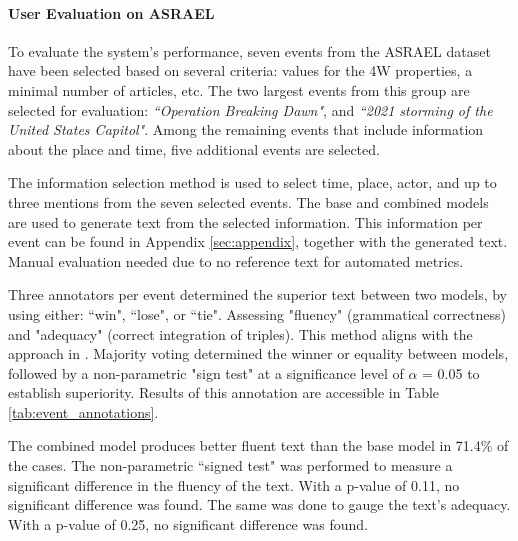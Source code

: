 \documentclass[
hf, %
]{ceurart}
\begin{document}
\paragraph*{User Evaluation on ASRAEL}
\label{sec:result_gen_text_nodes}
To evaluate the system's performance, seven events from the ASRAEL dataset have been selected based on several criteria: values for the 4W properties, a minimal number of articles, etc. The two largest events from this group are selected for evaluation: \textit{``Operation Breaking Dawn"}, and \textit{``2021 storming of the United States Capitol"}. Among the remaining events that include information about the place and time, five additional events are selected.

The information selection method is used to select time, place, actor, and up to three mentions from the seven selected events. The base and combined models are used to generate text from the selected information. This information per event can be found in Appendix \ref{sec:appendix}, together with the generated text. Manual evaluation needed due to no reference text for automated metrics.

Three annotators per event determined the superior text between two models, by using either: ``win", ``lose", or ``tie". Assessing "fluency" (grammatical correctness) and "adequacy" (correct integration of triples). This method aligns with the approach in \cite{JointGT}. Majority voting determined the winner or equality between models, followed by a non-parametric "sign test" at a significance level of $\alpha$ = 0.05 to establish superiority. Results of this annotation are accessible in Table \ref{tab:event_annotations}.

The combined model produces better fluent text than the base model in 71.4\% of the cases. The non-parametric ``signed test" was performed to measure a significant difference in the fluency of the text. With a p-value of 0.11, no significant difference was found. The same was done to gauge the text's adequacy. With a p-value of 0.25, no significant difference was found.
\end{document}
